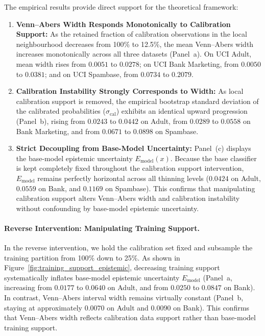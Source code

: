 \documentclass[11pt]{article}
\begin{document}
	The empirical results provide direct support for the theoretical framework:
	\begin{enumerate}
		\item \textbf{Venn--Abers Width Responds Monotonically to Calibration Support:} As the retained fraction of calibration observations in the local neighbourhood decreases from 100\% to 12.5\%, the mean Venn--Abers width increases monotonically across all three datasets (Panel~a). On UCI Adult, mean width rises from $0.0051$ to $0.0278$; on UCI Bank Marketing, from $0.0050$ to $0.0381$; and on UCI Spambase, from $0.0734$ to $0.2079$.
		\item \textbf{Calibration Instability Strongly Corresponds to Width:} As local calibration support is removed, the empirical bootstrap standard deviation of the calibrated probabilities ($\sigma_{\mathrm{cal}}$) exhibits an identical upward progression (Panel~b), rising from $0.0243$ to $0.0442$ on Adult, from $0.0289$ to $0.0558$ on Bank Marketing, and from $0.0671$ to $0.0898$ on Spambase.
		\item \textbf{Strict Decoupling from Base-Model Uncertainty:} Panel~(c) displays the base-model epistemic uncertainty $E_{\mathrm{model}}(x)$. Because the base classifier is kept completely fixed throughout the calibration support intervention, $E_{\mathrm{model}}$ remains perfectly horizontal across all thinning levels ($0.0424$ on Adult, $0.0559$ on Bank, and $0.1169$ on Spambase). This confirms that manipulating calibration support alters Venn--Abers width and calibration instability without confounding by base-model epistemic uncertainty.
	\end{enumerate}

	\paragraph{Reverse Intervention: Manipulating Training Support.}
	In the reverse intervention, we hold the calibration set fixed and subsample the training partition from 100\% down to 25\%. As shown in Figure~\ref{fig:training_support_epistemic}, decreasing training support systematically inflates base-model epistemic uncertainty $E_{\mathrm{model}}$ (Panel~a, increasing from $0.0177$ to $0.0640$ on Adult, and from $0.0250$ to $0.0847$ on Bank). In contrast, Venn--Abers interval width remains virtually constant (Panel~b, staying at approximately $0.0070$ on Adult and $0.0090$ on Bank). This confirms that Venn--Abers width reflects calibration data support rather than base-model training support.
\end{document}
